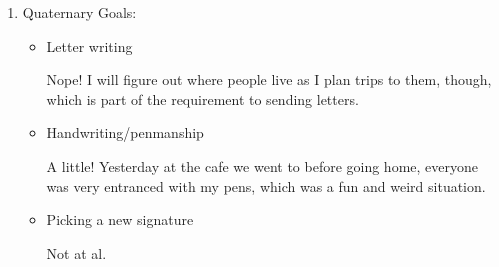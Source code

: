 \documentclass[12pt]{article}
\newcommand{\say}[1]{``#1''}
\renewcommand{\,}{\textsuperscript{,}}
\begin{document}
\begin{enumerate}
\begin{itemize}
\item Web Noveling?

Wrote last week's chapter, have yet to write this week's.

\item Guitar?

Some! Did a little with the whole \say{learn the actual instrument through the book}, but only the very slightest bit. Probably would be good and healthy and personally helpful for me to schedule time for it.

\item Other hobbies?

Nope! I don't know if I have other hobbies right now, or if I really want them.  
I guess that I was chatting with someone about song writing over the weekend, so could be good to return to that.\footnote{she also mostly does Christian music, and I have never really done music that connects to my faith, so that will probably be reallly helpful for me.}

\end{itemize}

\item Quaternary Goals:

\begin{itemize}

\item Letter writing

Nope! I will figure out where people live as I plan trips to them, though, which is part of the requirement to sending letters.

\item Handwriting/penmanship

A little! Yesterday at the cafe we went to before going home, everyone was very entranced with my pens, which was a fun and weird situation.

\item Picking a new signature

Not at al.

\end{itemize}

\end{enumerate}
\end{document}
